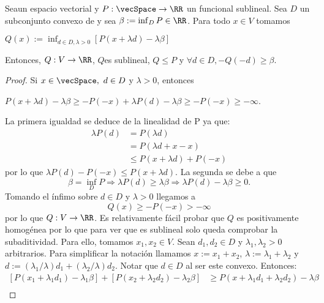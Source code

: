 	\begin{lemaBox}\label{lema2}
		Sea\vecSpace un espacio vectorial y $P:\vecSpace \rightarrow \RR$ un funcional sublineal. Sea $ D $ un subconjunto convexo de \vecSpace y sea $ \beta := \inf_D P \in \RR $. Para todo $ x \in V $ tomamos  
		\begin{center}
			$ Q(x) := \inf_{d \in D, \lambda > 0} \left[P(x+\lambda d) - \lambda \beta\right] $
		\end{center}
		
		Entonces, $ Q:V \rightarrow \RR$, $ Q $es sublineal, $ Q \leq P $ y $ \forall d \in D, -Q(-d) \geq \beta$.
	\end{lemaBox} 
	\begin{proof}
		Si $ x \in \vecSpace,\text{ }d \in D $ y $ \lambda > 0 $, entonces
		\begin{center}
			$ P(x+ \lambda d) - \lambda \beta \geq -P(-x) + \lambda P(d)-\lambda\beta \geq -P(-x) \geq -\infty$.
		\end{center}
		La primera igualdad se deduce de la linealidad de P ya que:
		\begin{equation*}
		\begin{split}
		\lambda P(d) &= P(\lambda d) \\ 
		&=P(\lambda d +x-x) \\ 
		&\leq P(x+\lambda d)+ P(-x)
		\end{split}
		\end{equation*}
		por lo que $ \lambda P(d)-P(-x) \leq P(x+\lambda d) $. La segunda se debe a que
		\[\beta = \inf_D P \Longrightarrow \lambda P(d) \geq \lambda\beta \Longrightarrow\lambda P(d) - \lambda\beta \geq 0. \]
		Tomando el ínfimo sobre $ d \in D  $ y $ \lambda > 0 $ llegamos a \[ Q(x)\geq -P(-x) > -\infty\] por lo que $ Q:V \rightarrow \RR$. Es relativamente fácil probar que $ Q $ es positivamente homogénea por lo que para ver que es sublineal solo queda comprobar la subaditividad. Para ello, tomamos $ x_1, x_2 \in V $. Sean $ d_1, d_2 \in D $ y $ \lambda_1, \lambda_2 > 0$ arbitrarios. Para simplificar la notación llamamos $ x := x_1 + x_2 $, $ \lambda := \lambda_1 + \lambda_2 $ y $ d:= (\lambda_1/\lambda)d_1 + (\lambda_2/\lambda)d_2 $. Notar que $ d \in D $ al ser este convexo. Entonces: 
		\begin{equation*}
		\begin{split}
		\left[ P(x_1 + \lambda_1 d_1) - \lambda_1 \beta \right] + \left[ P(x_2 + \lambda_2 d_2) - \lambda_2 \beta \right] &\geq P(x + \lambda_1 d_1 + \lambda_2 d_2) - \lambda \beta\\

\end{split}
\end{equation*}
\end{proof}
